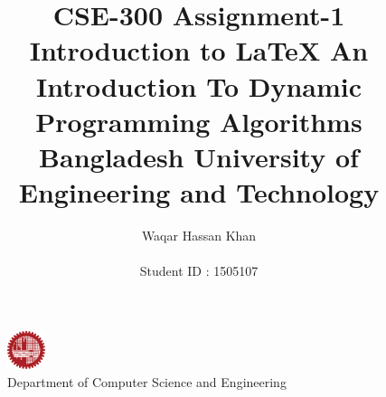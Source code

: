 \documentclass[12pt]{article}
\title{
	\Large{CSE-300 Assignment-1}
	\endgraf
	\Large{Introduction to \LaTeX}
	\endgraf\bigskip	
	\textbf{An Introduction To Dynamic Programming Algorithms}
	\endgraf\bigskip
}
\author{
	\Large{Waqar Hassan Khan}\\\\
	\Large{Student ID : 1505107}
}
\date{}
\begin{document}
\maketitle

\section*{}
\begin{figure}[h]
	\centering
	
	\captionsetup{justification=centering}
	\includegraphics[width = 0.1\textwidth]{image/buet.png}
	\caption{Department of Computer Science and Engineering}
	
\end{figure}


\title{Bangladesh University of Engineering and Technology}

	
	
\end{document}
